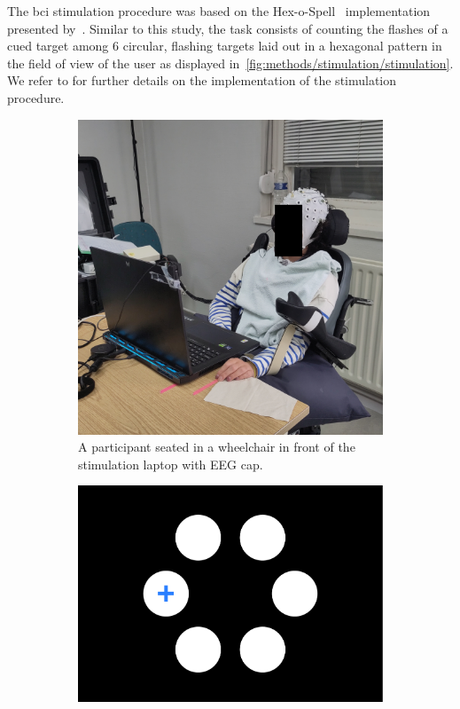 \documentclass{article}
\begin{document}
The \ac{bci} stimulation procedure was based on the
Hex-o-Spell~\cite{Treder2010} implementation presented
by~\textcite{VanDenKerchove2024}.
Similar to this study, the task consists of counting the flashes of a cued
target among 6 circular, flashing targets laid out in a hexagonal pattern in the
field of view of the user as displayed
in~\cref{fig:methods/stimulation/stimulation}.
We refer to \textcite{VanDenKerchove2024} for further details on the implementation
of the stimulation procedure.
\begin{figure}
	\centering
	\begin{subfigure}[b]{.41\textwidth}
		\includegraphics[width=\textwidth]{figures/PD01b-obfuscated.jpg}
		\caption{A participant seated in a wheelchair in front of the stimulation laptop with EEG
			cap.}
	\end{subfigure}\hfill%
	\begin{minipage}[b]{.54\textwidth}
		\begin{subfigure}[b]{.45\linewidth}
			\includegraphics[width=\textwidth]{figures/stim_overt.pdf}

\end{subfigure}
\end{minipage}
\end{figure}
\end{document}
